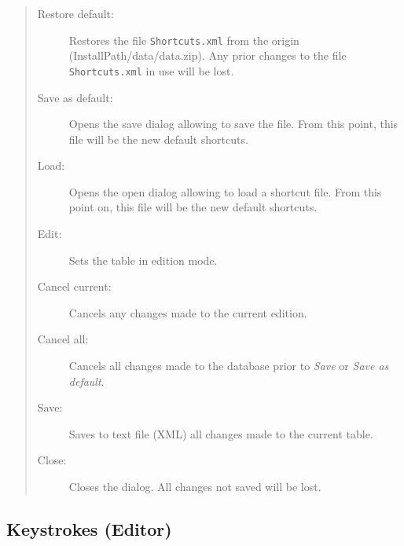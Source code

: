 \begin{quote}
  \begin{footnotesize}
    \begin{description}
      \item[Restore default:]
        Restores the file \texttt{Shortcuts.xml} from the origin
        (InstallPath/data/data.zip). Any prior changes to the file
        \texttt{Shortcuts.xml} in use will be lost.
      \item[Save as default:]
        Opens the save dialog allowing to save the file. From this
        point, this file will be the new default shortcuts.
      \item[Load:]
        Opens the open dialog allowing to load a shortcut file. From this
        point on, this file will be the new default shortcuts.
      \item[Edit:]
        Sets the table in edition mode.
      \item[Cancel current:]
        Cancels any changes made to the current edition.
      \item[Cancel all:]
        Cancels all changes made to the database prior to \textit{Save}
        or \textit{Save as default}.
      \item[Save:]
        Saves to text file (XML) all changes made to the current table.
      \item[Close:]
        Closes the dialog. All changes not saved will be lost.
    \end{description}
  \end{footnotesize}
\end{quote}


\hypertarget{dlg_keystrokes_editor}{}
\subsection{Keystrokes (Editor)}

